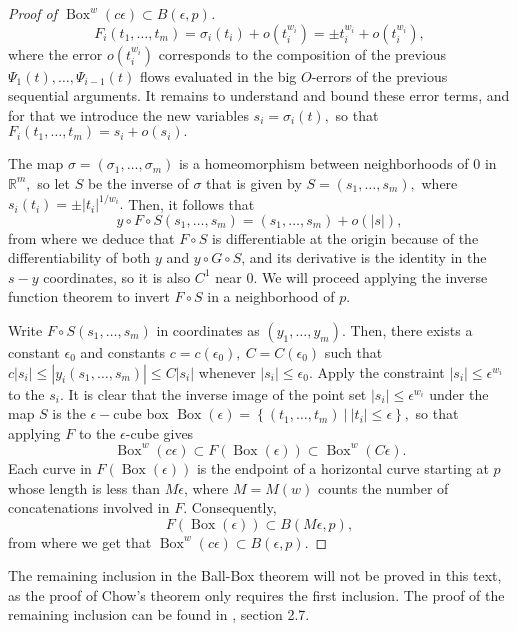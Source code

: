 \documentclass[12pt, letterpaper, reqno]{amsart}
\theoremstyle{definition}
\theoremstyle{plain}
\theoremstyle{remark}
\begin{document}
\begin{proof}[Proof of $\operatorname{Box}^w(c\epsilon)\subset B(\epsilon, p)$]
$$ F_i(t_1,\dots,t_m) = \sigma_i(t_i) + o(t_i^{w_i}) = \pm t_i^{w_i} + o(t_i^{w_i}), $$ 
where the error $ o(t_i^{w_i}) $ corresponds to the composition of the previous $ \Psi_1(t), \dots,\Psi_{i-1}(t) $ flows evaluated in the big $ O $-errors of the previous sequential arguments. It remains to understand and bound these error terms, and for that we introduce the new variables $ s_i=\sigma_i(t), $ so that $ F_i(t_1,\dots,t_m)= s_i + o(s_i). $  

The map $ \sigma=(\sigma_1,\dots,\sigma_m) $ is a homeomorphism between neighborhoods of $ 0 $ in $ \mathbb{R}^m, $ so let $ S $ be the inverse of $ \sigma $ that is given by $ S=(s_1,\dots,s_m), $ where $ s_i(t_i)=\pm |t_i|^{1/w_i}. $ Then, it follows that
$$ y\circ F\circ S (s_1,\dots,s_m) = (s_1,\dots,s_m) + o(|s|), $$ 
from where we deduce that $ F\circ S$ is differentiable at the origin because of the differentiability of both $ y $ and $ y\circ G\circ S $, and its derivative is the identity in the $ s-y $ coordinates, so it is also $ C^1 $ near $ 0. $ We will proceed applying the inverse function theorem to invert $ F\circ S $ in a neighborhood of $ p. $ 

Write $ F\circ S(s_1,\dots,s_m) $ in coordinates as $ (y_1,\dots,y_m).$ Then, there exists a constant $ \epsilon_0 $ and constants $ c=c(\epsilon_0), \ C=C(\epsilon_0) $ such that $ c|s_i| \leq |y_i(s_1,\dots,s_m)|  \leq C|s_i|$ whenever $ |s_i|\leq \epsilon_0. $ Apply the constraint $ |s_i|\leq \epsilon^{w_i} $ to the $ s_i. $ It is clear that the inverse image of the point set $ |s_i|\leq \epsilon^{w_i} $ under the map $ S $ is the $ \epsilon- $cube box $ \operatorname{Box}(\epsilon)= \left\{ (t_1,\dots,t_m)\ | \ |t_i|\leq \epsilon \right\},  $  so that applying $ F $ to the $ \epsilon $-cube gives
$$ \operatorname{Box}^{w}(c\epsilon) \subset F( \operatorname{Box}(\epsilon) ) \subset \operatorname{Box}^w(C\epsilon).   $$ 
Each curve in $ F( \operatorname{Box} (\epsilon) )$ is the endpoint of a horizontal curve starting at $ p $ whose length is less than $ M\epsilon $, where $ M=M(w) $ counts the number of concatenations involved in $ F. $ Consequently,
$$ F( \operatorname{Box} (\epsilon)) \subset B(M\epsilon, p), $$ 
from where we get that $ \operatorname{Box}^w (c\epsilon)\subset B(\epsilon,p). $ 
\end{proof}
The remaining inclusion in the Ball-Box theorem will not be proved in this text, as the proof of Chow's theorem only requires the first inclusion. The proof of the remaining inclusion can be found in \cite{montgomery2002tour}, section 2.7.
\end{document}
